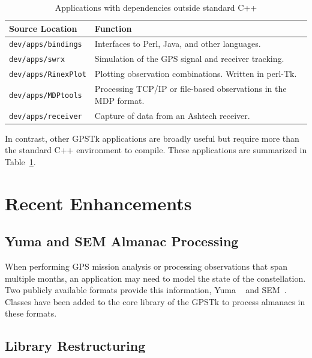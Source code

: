 \documentclass[letterpaper,ugly,10pt]{ion-gps}
\newcommand{\gpstkdir}[1]{\texttt{\mbox{#1}}}
\begin{document}
\begin{table}
\centering
\begin{tabular}{ll} \hline \hline
Source Location &  Function \\ \hline
\gpstkdir{dev/apps/bindings} & Interfaces to Perl, Java, and other languages. \\
\gpstkdir{dev/apps/swrx} & Simulation of the GPS signal and receiver tracking. \\
\gpstkdir{dev/apps/RinexPlot} & Plotting observation combinations. Written in perl-Tk. \\
\gpstkdir{dev/apps/MDPtools} & Processing TCP/IP or file-based observations in the MDP format.\\
\gpstkdir{dev/apps/receiver} & Capture of data from an Ashtech receiver. \\ \hline \hline 
\end{tabular}
\caption{Applications with dependencies outside standard C++}
\label{apptbl2}
\end{table}

In contrast, other GPSTk applications are broadly useful but require more than the standard C++ environment to compile. These applications are summarized in Table~\ref{apptbl2}.


\section*{Recent Enhancements}

\subsection*{Yuma and SEM Almanac Processing}

When performing GPS mission analysis or processing observations that span multiple months, an application may need to model the state of the constellation. Two publicly available formats provide this information, Yuma \mbox{ \cite{yumaformat}} and \mbox{SEM \cite{semformat}}. Classes have been added to the core library of the GPSTk to process almanacs in these formats.

\subsection*{Library Restructuring}
\end{document}
